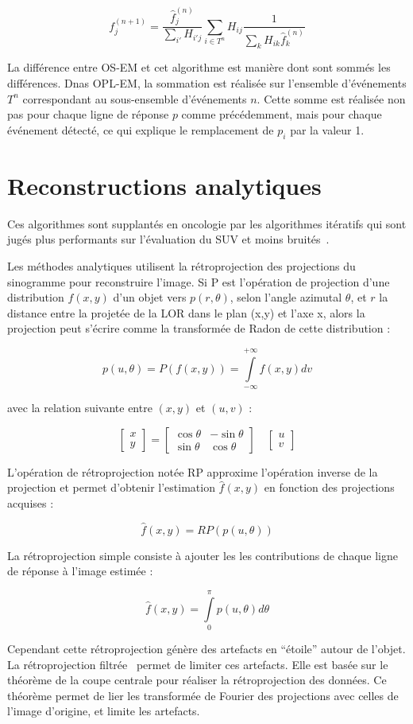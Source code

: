 \begin{equation}
	f_j^{(n+1)}=\frac{\hat{f}_j^{(n)}}{\sum\limits_{i'}H_{i'j}}\sum\limits_{i \in T^n}H_{ij}\frac{1}{\sum\limits_{k}H_{ik}\hat{f}_k^{(n)}}
\label{eq:OSEM_seq}
\end{equation}

La différence entre OS-EM et cet algorithme est manière dont sont sommés les différences. Dnas OPL-EM, la sommation est réalisée sur l'ensemble d'événements $T^n$ correspondant au sous-ensemble d'événements $n$. Cette somme est réalisée non pas pour chaque ligne de réponse $p$ comme précédemment, mais pour chaque événement détecté, ce qui explique le remplacement de $p_i$ par la valeur 1.
		
	\section{Reconstructions analytiques}
 
Ces algorithmes sont supplantés en oncologie par les algorithmes itératifs qui sont jugés plus performants sur l'évaluation du SUV et moins bruités~\cite{schoder2004clinical}.

Les méthodes analytiques utilisent la rétroprojection des projections du sinogramme pour reconstruire l'image. Si P est l'opération de projection d’une distribution $f(x,y)$ d’un objet vers $p(r, \theta)$, selon l’angle azimutal $\theta$, et $r$ la distance entre la projetée de la LOR dans le plan (x,y) et l’axe x, alors la projection peut s’écrire comme la transformée de Radon de cette distribution :

\[
p(u, \theta) = P(f(x,y)) = \int\limits_{-\infty}^{+\infty} f(x,y) dv
\]

avec la relation suivante entre $(x,y)$ et $(u,v)$ :

\[
	\begin{bmatrix}
	x \\
	y
	\end{bmatrix}
	=	
	\begin{bmatrix}
	\cos \theta &  - \sin \theta \\
	\sin \theta & \cos \theta
	\end{bmatrix}
	\quad
	\begin{bmatrix}
	u \\
	v
	\end{bmatrix}
\]

L'opération de rétroprojection notée RP approxime l'opération inverse de la projection et permet d'obtenir l'estimation $\hat{f}(x,y)$ en fonction des projections acquises :

\[
\hat{f}(x,y) = RP(p(u, \theta))
\]

La rétroprojection simple consiste à ajouter les les contributions de chaque ligne de réponse à l'image estimée :

\[
\hat{f}(x,y) = \int\limits_0^\pi p(u, \theta)d\theta
\]

Cependant cette rétroprojection génère des artefacts en ``étoile'' autour de l'objet. La rétroprojection filtrée~\cite{kinahan1988three} permet de limiter ces artefacts. Elle est basée sur le théorème de la coupe centrale pour réaliser la rétroprojection des données. Ce théorème permet de lier les transformée de Fourier des projections avec celles de l'image d'origine, et limite les artefacts. 
